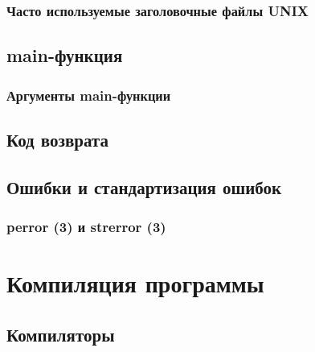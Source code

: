 \documentclass[oneside]{book}
\begin{document}
         \subsection{Часто используемые заголовочные файлы UNIX}
         

      \section{main-функция}
      

         \subsection{Аргументы main-функции}
         

      \section{Код возврата}
      

      \section{Ошибки и стандартизация ошибок}
      

         \subsection{perror (3) и strerror (3)}
         

   \chapter{Компиляция программы}
   

      \section{Компиляторы}
      
\end{document}
